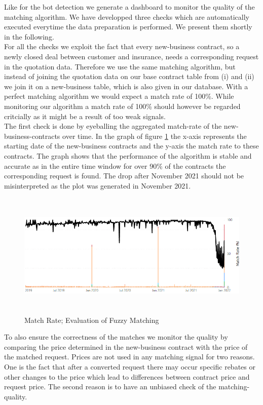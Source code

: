 \documentclass[12pt,titlepage]{article}
\begin{document}
Like for the bot detection we generate a dashboard to monitor the quality of the matching algorithm. We have developped three checks which are automatically executed everytime the data preparation is performed. We present them shortly in the following. \\
For all the checks we exploit the fact that every new-business contract, so a newly closed deal between customer and insurance, needs a corresponding request in the quotation data. Therefore we use the same matching algorithm, but instead of joining the quotation data on our base contract table from (i) and (ii) we join it on a new-business table, which is also given in our database. With a perfect matching algorithm we would expect a match rate of 100\%. While monitoring our algorithm a match rate of 100\% should however be regarded critcially as it might be a result of too weak signals. \\
The first check is done by eyeballing the aggregated match-rate of the new-business-contracts over time. In the graph of figure \ref{fig:matchrate} the x-axis represents the starting date of the new-business contracts and the y-axis the match rate to these contracts. The graph shows that the performance of the algorithm is stable and accurate as in the entire time window for over 90\% of the contracts the corresponding request is found. The drop after November 2021 should not be misinterpreted as the plot was generated in November 2021. \\
\begin{figure}[H]
    \centerline{\includegraphics[height=6cm]{matching.png}}
\caption{Match Rate; Evaluation of Fuzzy Matching}
\label{fig:matchrate}
\end{figure}
\noindent
To also ensure the correctness of the matches we monitor the quality by comparing the price determined in the new-business contract with the price of the matched request. Prices are not used in any matching signal for two reasons. One is the fact that after a converted request there may occur specific rebates or other changes to the price which lead to differences between contract price and request price. The second reason is to have an unbiased check of the matching-quality. \\
\end{document}
